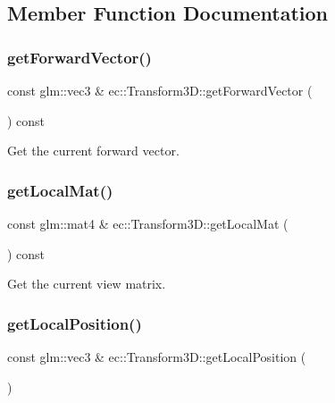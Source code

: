 \subsection{Member Function Documentation}
\mbox{\label{classec_1_1_transform3_d_afc4f5c1122a5191ad2a4628a43a76a7c}} 
\subsubsection{\texorpdfstring{get\+Forward\+Vector()}{getForwardVector()}}
{\footnotesize\ttfamily const glm\+::vec3 \& ec\+::\+Transform3\+D\+::get\+Forward\+Vector (\begin{DoxyParamCaption}{ }\end{DoxyParamCaption}) const}



Get the current forward vector. 

\mbox{\label{classec_1_1_transform3_d_a8aa0ac4df795971dad499a0d12348d07}} 
\subsubsection{\texorpdfstring{get\+Local\+Mat()}{getLocalMat()}}
{\footnotesize\ttfamily const glm\+::mat4 \& ec\+::\+Transform3\+D\+::get\+Local\+Mat (\begin{DoxyParamCaption}{ }\end{DoxyParamCaption}) const}



Get the current view matrix. 

\mbox{\label{classec_1_1_transform3_d_a69ce5285f9481b5615c084b9f892fdb8}} 
\subsubsection{\texorpdfstring{get\+Local\+Position()}{getLocalPosition()}}
{\footnotesize\ttfamily const glm\+::vec3 \& ec\+::\+Transform3\+D\+::get\+Local\+Position (\begin{DoxyParamCaption}{ }\end{DoxyParamCaption})}

